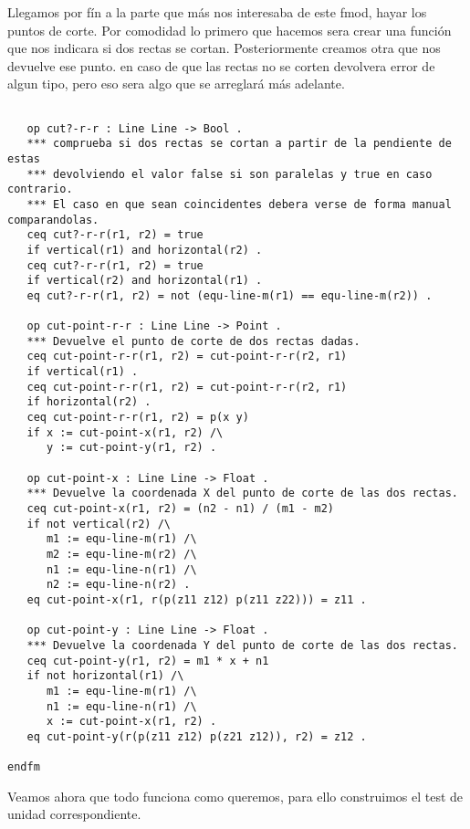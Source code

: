 \documentclass[12pt,a4paper]{book}
\begin{document}
Llegamos por f\'in a la parte que m\'as nos interesaba de este fmod, hayar los puntos de corte.
Por comodidad lo primero que hacemos sera crear una funci\'on que nos indicara si dos rectas se cortan.
Posteriormente creamos otra que nos devuelve ese punto. en caso de que las rectas no se corten devolvera error de algun tipo, pero eso sera algo que se arreglar\'a m\'as adelante. 

\begin{verbatim}	

   op cut?-r-r : Line Line -> Bool .
   *** comprueba si dos rectas se cortan a partir de la pendiente de estas
   *** devolviendo el valor false si son paralelas y true en caso contrario.
   *** El caso en que sean coincidentes debera verse de forma manual comparandolas.
   ceq cut?-r-r(r1, r2) = true 
   if vertical(r1) and horizontal(r2) .
   ceq cut?-r-r(r1, r2) = true 
   if vertical(r2) and horizontal(r1) .
   eq cut?-r-r(r1, r2) = not (equ-line-m(r1) == equ-line-m(r2)) .

   op cut-point-r-r : Line Line -> Point .
   *** Devuelve el punto de corte de dos rectas dadas.
   ceq cut-point-r-r(r1, r2) = cut-point-r-r(r2, r1)
   if vertical(r1) .
   ceq cut-point-r-r(r1, r2) = cut-point-r-r(r2, r1)
   if horizontal(r2) .
   ceq cut-point-r-r(r1, r2) = p(x y)
   if x := cut-point-x(r1, r2) /\
      y := cut-point-y(r1, r2) .

   op cut-point-x : Line Line -> Float .
   *** Devuelve la coordenada X del punto de corte de las dos rectas.
   ceq cut-point-x(r1, r2) = (n2 - n1) / (m1 - m2)
   if not vertical(r2) /\
      m1 := equ-line-m(r1) /\
      m2 := equ-line-m(r2) /\
      n1 := equ-line-n(r1) /\
      n2 := equ-line-n(r2) .
   eq cut-point-x(r1, r(p(z11 z12) p(z11 z22))) = z11 .
	
   op cut-point-y : Line Line -> Float .
   *** Devuelve la coordenada Y del punto de corte de las dos rectas.
   ceq cut-point-y(r1, r2) = m1 * x + n1
   if not horizontal(r1) /\
      m1 := equ-line-m(r1) /\
      n1 := equ-line-n(r1) /\
      x := cut-point-x(r1, r2) .
   eq cut-point-y(r(p(z11 z12) p(z21 z12)), r2) = z12 .

endfm

\end{verbatim}

Veamos ahora que todo funciona como queremos, para ello construimos el test de unidad correspondiente.
\end{document}
